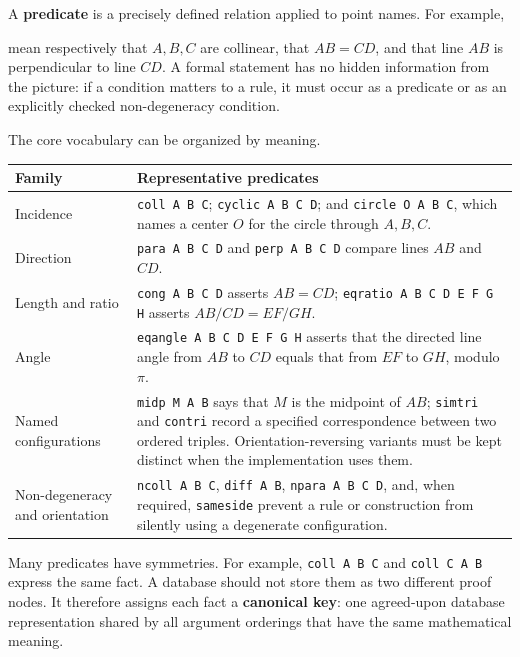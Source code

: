 \documentclass[reqno]{amsart}
\newcommand{\keyterm}[1]{\textbf{\color{agblue}#1}}
\newcommand{\codeseg}[1]{%
    \begingroup
    \setlength{\fboxsep}{1.5pt}%
    \colorbox{agcodebg}{\texttt{\detokenize{#1}}}%
    \endgroup
}
\DeclareMathOperator{\1}{\textbf{1}}
\begin{document}
A \keyterm{predicate} is a precisely defined relation applied to point names.
For example,
\begin{center}
\codeseg{coll A B C}\qquad
\codeseg{cong A B C D}\qquad
\codeseg{perp A B C D}
\end{center}
mean respectively that $A,B,C$ are collinear, that $AB=CD$, and that line
$AB$ is perpendicular to line $CD$. A formal statement has no hidden
information from the picture: if a condition matters to a rule, it must occur
as a predicate or as an explicitly checked non-degeneracy condition.

The core vocabulary can be organized by meaning.

\begin{center}
\begin{tabular}{p{}p{}}
\textbf{Family} & \textbf{Representative predicates} \\
\hline
Incidence & \verb|coll A B C|; \verb|cyclic A B C D|; and
\verb|circle O A B C|, which names a center $O$ for the circle through
$A,B,C$. \\
Direction & \verb|para A B C D| and \verb|perp A B C D| compare lines
$AB$ and $CD$. \\
Length and ratio & \verb|cong A B C D| asserts $AB=CD$;
\verb|eqratio A B C D E F G H| asserts
$AB/CD=EF/GH$. \\
Angle & \verb|eqangle A B C D E F G H| asserts that the directed line angle
from $AB$ to $CD$ equals that from $EF$ to $GH$, modulo $\pi$. \\
Named configurations & \verb|midp M A B| says that $M$ is the midpoint of
$AB$; \verb|simtri| and \verb|contri| record a specified correspondence
between two ordered triples. Orientation-reversing variants must be kept
distinct when the implementation uses them. \\
Non-degeneracy and orientation & \verb|ncoll A B C|, \verb|diff A B|,
\verb|npara A B C D|, and, when required, \verb|sameside| prevent a rule or
construction from silently using a degenerate configuration. \\
\end{tabular}
\end{center}

Many predicates have symmetries. For example, \verb|coll A B C| and
\verb|coll C A B| express the same fact. A database should not store them as
two different proof nodes. It therefore assigns each fact a
\keyterm{canonical key}: one agreed-upon database representation shared by
all argument orderings that have the same mathematical meaning.
\end{document}
